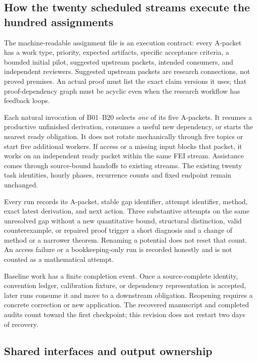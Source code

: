 \documentclass[11pt]{article}
\begin{document}
\subsection{How the twenty scheduled streams execute the hundred assignments}

The machine-readable assignment file is an execution contract: every A-packet has a work type, priority, expected artifacts, specific acceptance criteria, a bounded initial pilot, suggested upstream packets, intended consumers, and independent reviewers. Suggested upstream packets are research connections, not proved premises. An actual proof must list the exact claim versions it uses; that proof-dependency graph must be acyclic even when the research workflow has feedback loops.

Each natural invocation of B01--B20 selects \emph{one} of its five A-packets. It resumes a productive unfinished derivation, consumes a useful new dependency, or starts the nearest ready obligation. It does not rotate mechanically through five topics or start five additional workers. If access or a missing input blocks that packet, it works on an independent ready packet within the same FEI stream. Assistance comes through source-bound handoffs to existing streams. The existing twenty task identities, hourly phases, recurrence counts and fixed endpoint remain unchanged.

Every run records its A-packet, stable gap identifier, attempt identifier, method, exact latest derivation, and next action. Three substantive attempts on the same unresolved gap without a new quantitative bound, structural distinction, valid counterexample, or repaired proof trigger a short diagnosis and a change of method or a narrower theorem. Renaming a potential does not reset that count. An access failure or a bookkeeping-only run is recorded honestly and is not counted as a mathematical attempt.

Baseline work has a finite completion event. Once a source-complete identity, convention ledger, calibration fixture, or dependency representation is accepted, later runs consume it and move to a downstream obligation. Reopening requires a concrete correction or new application. The recovered manuscript and completed audits count toward the first checkpoint; this revision does not restart two days of recovery.

\subsection{Shared interfaces and output ownership}
\end{document}
